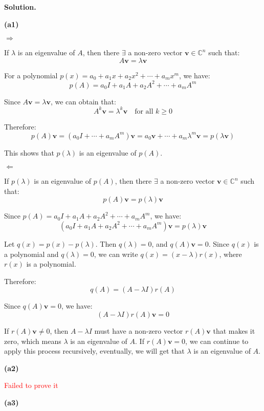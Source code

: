 \documentclass[12pt, a4paper, oneside]{ctexart}
\newenvironment{solution}{\par\noindent\textbf{Solution. }}{\par}
\begin{document}
\begin{solution}

\textbf{(a1)}

$\Rightarrow$

If $ \lambda $ is an eigenvalue of $ A $, then there $\exists$ a non-zero vector $ \mathbf{v}\in\mathbb{C}^n $ such that:
$$
A\mathbf{v}=\lambda\mathbf{v}
$$

For a polynomial $ p(x)=a_0 + a_1x + a_2x^2+\cdots + a_mx^m $, we have:
$$
p(A)=a_0I + a_1A + a_2A^2+\cdots + a_mA^m
$$

Since $ A\mathbf{v}=\lambda\mathbf{v} $, we can obtain that:
$$
A^k\mathbf{v}=\lambda^k\mathbf{v}\quad\text{for all }k\geq0
$$

Therefore:
$$
p(A)\mathbf{v}=(a_0I +\cdots + a_mA^m)\mathbf{v}=a_0\mathbf{v}+\cdots + a_m\lambda^m\mathbf{v}=p(\lambda \mathbf{v})
$$

This shows that $ p(\lambda) $ is an eigenvalue of $ p(A) $.

$\Leftarrow$

If $ p(\lambda) $ is an eigenvalue of $ p(A) $, then there $\exists$ a non-zero vector $ \mathbf{v}\in\mathbb{C}^n $ such that:
$$
p(A)\mathbf{v}=p(\lambda)\mathbf{v}
$$

Since $ p(A)=a_0I + a_1A + a_2A^2+\cdots + a_mA^m $, we have:
$$
(a_0I + a_1A + a_2A^2+\cdots + a_mA^m)\mathbf{v}=p(\lambda)\mathbf{v}
$$

Let $ q(x)=p(x)-p(\lambda) $. Then $ q(\lambda)=0 $, and $ q(A)\mathbf{v}=0 $. Since $ q(x) $ is a polynomial and $ q(\lambda)=0 $, we can write $ q(x)=(x - \lambda)r(x) $, where $ r(x) $ is a polynomial.

Therefore:
$$
q(A)=(A-\lambda I)r(A)
$$

Since $ q(A)\mathbf{v}=0 $, we have:
$$
(A - \lambda I)r(A)\mathbf{v}=0
$$

If $ r(A)\mathbf{v}\neq0 $, then $ A-\lambda I $ must have a non-zero vector $ r(A)\mathbf{v} $ that makes it zero, which means $ \lambda $ is an eigenvalue of $ A $. If $ r(A)\mathbf{v}=0 $, we can continue to apply this process recursively, eventually, we will get that $ \lambda $ is an eigenvalue of $ A $.

\vspace{12pt}

\textbf{(a2)}

\textcolor{red}{Failed to prove it}

\vspace{12pt}
	
\textbf{(a3)}


\end{solution}
\end{document}
